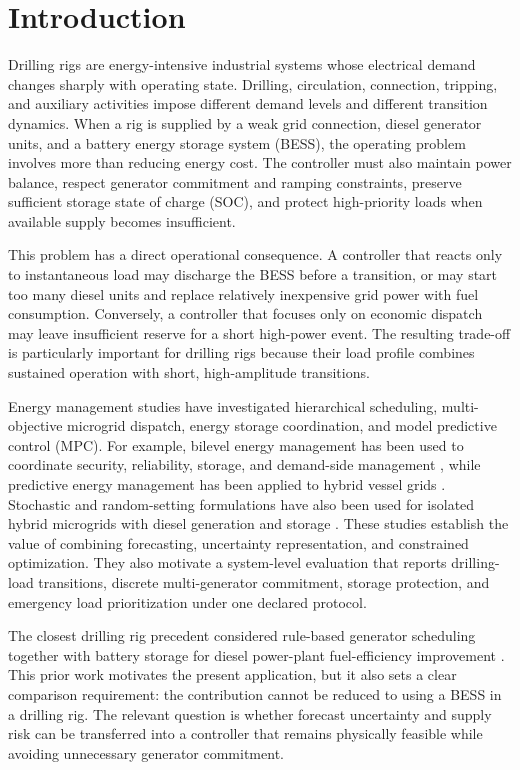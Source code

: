 \section{Introduction}\label{introduction}

Drilling rigs are energy-intensive industrial systems whose electrical
demand changes sharply with operating state. Drilling, circulation,
connection, tripping, and auxiliary activities impose different demand
levels and different transition dynamics. When a rig is supplied by a
weak grid connection, diesel generator units, and a battery energy
storage system (BESS), the operating problem involves more than reducing
energy cost. The controller must also maintain power balance, respect
generator commitment and ramping constraints, preserve sufficient
storage state of charge (SOC), and protect high-priority loads when
available supply becomes insufficient.

This problem has a direct operational consequence. A controller that
reacts only to instantaneous load may discharge the BESS before a
transition, or may start too many diesel units and replace relatively
inexpensive grid power with fuel consumption. Conversely, a controller
that focuses only on economic dispatch may leave insufficient reserve
for a short high-power event. The resulting trade-off is particularly
important for drilling rigs because their load profile combines
sustained operation with short, high-amplitude transitions.

Energy management studies have investigated hierarchical scheduling,
multi-objective microgrid dispatch, energy storage coordination, and
model predictive control (MPC). For example, bilevel energy management
has been used to coordinate security, reliability, storage, and
demand-side management
\citep{jokar2022bilevel},
while predictive energy management has been applied to hybrid vessel
grids \citep{vafamand2020predictive}. Stochastic and random-setting formulations have also been used
for isolated hybrid microgrids with diesel generation and storage
\citep{vergine2022optimal}.
These studies establish the value of combining forecasting, uncertainty
representation, and constrained optimization. They also motivate a
system-level evaluation that reports drilling-load transitions, discrete
multi-generator commitment, storage protection, and emergency load
prioritization under one declared protocol.

The closest drilling rig precedent considered rule-based generator
scheduling together with battery storage for diesel power-plant
fuel-efficiency improvement
\citep{pavkovic2016oil}. This prior work motivates the present application, but it also
sets a clear comparison requirement: the contribution cannot be reduced
to using a BESS in a drilling rig. The relevant question is whether
forecast uncertainty and supply risk can be transferred into a
controller that remains physically feasible while avoiding unnecessary
generator commitment.

